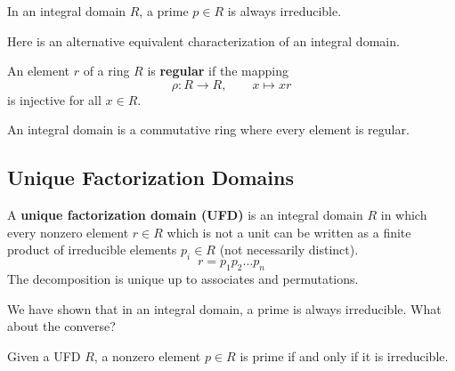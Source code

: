   \begin{theorem}
    In an integral domain $R$, a prime $p \in R$ is always irreducible. 
  \end{theorem}

  Here is an alternative equivalent characterization of an integral domain. 

  \begin{definition}
     An element $r$ of a ring $R$ is \textbf{regular} if the mapping 
     \begin{equation}
       \rho: R \longrightarrow R, \qquad x \mapsto x r
     \end{equation}
    is injective for all $x \in R$. 
  \end{definition}

  \begin{theorem}
    An integral domain is a commutative ring where every element is regular. 
  \end{theorem} 

\subsection{Unique Factorization Domains}

  \begin{definition}
    A \textbf{unique factorization domain (UFD)} is an integral domain $R$ in which every nonzero element $r \in R$ which is not a unit 
    can be written as a finite product of irreducible elements $p_i \in R$ (not necessarily distinct). 
    \begin{equation}
      r = p_1 p_2 \ldots p_n
    \end{equation}
    The decomposition is unique up to associates and permutations. 
  \end{definition}

  We have shown that in an integral domain, a prime is always irreducible. What about the converse? 

  \begin{theorem}
    Given a UFD $R$, a nonzero element $p \in R$ is prime if and only if it is irreducible. 
  \end{theorem}

